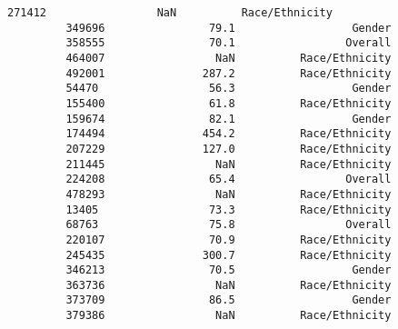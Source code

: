\documentclass[11pt]{article}
\begin{document}
\begin{Verbatim}[commandchars=\\\{\}]
         271412                 NaN          Race/Ethnicity   
         349696                79.1                  Gender   
         358555                70.1                 Overall   
         464007                 NaN          Race/Ethnicity   
         492001               287.2          Race/Ethnicity   
         54470                 56.3                  Gender   
         155400                61.8          Race/Ethnicity   
         159674                82.1                  Gender   
         174494               454.2          Race/Ethnicity   
         207229               127.0          Race/Ethnicity   
         211445                 NaN          Race/Ethnicity   
         224208                65.4                 Overall   
         478293                 NaN          Race/Ethnicity   
         13405                 73.3          Race/Ethnicity   
         68763                 75.8                 Overall   
         220107                70.9          Race/Ethnicity   
         245435               300.7          Race/Ethnicity   
         346213                70.5                  Gender   
         363736                 NaN          Race/Ethnicity   
         373709                86.5                  Gender   
         379386                 NaN          Race/Ethnicity   
         

\end{Verbatim}
\end{document}
